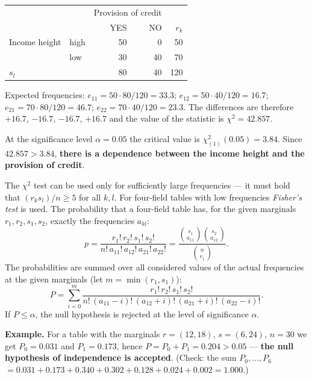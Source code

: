 \documentclass[11pt,a4paper]{article}
\theoremstyle{definition}
\begin{document}
\begin{defbox}
\begin{center}
\begin{tabular}{@{}llrrr@{}}
\toprule
& & \multicolumn{2}{c}{Provision of credit} & \\
& & YES & NO & $r_k$ \\
\midrule
Income height & high & 50 & 0 & 50 \\
              & low & 30 & 40 & 70 \\
\midrule
$s_l$ & & 80 & 40 & 120 \\
\bottomrule
\end{tabular}
\end{center}

Expected frequencies: $e_{11}=50\cdot 80/120=33.3$; $e_{12}=50\cdot 40/120=16.7$;
$e_{21}=70\cdot 80/120=46.7$; $e_{22}=70\cdot 40/120=23.3$. The differences are therefore
$+16.7$, $-16.7$, $-16.7$, $+16.7$ and the value of the statistic is $\chi^2=42.857$.

At the significance level $\alpha=0.05$ the critical value is
$\chi^2_{(1)}(0.05)=3.84$. Since $42.857>3.84$, \textbf{there is a dependence between the income
height and the provision of credit}.
\end{defbox}

\begin{defbox}
The $\chi^2$ test can be used only for sufficiently large frequencies --- it must hold that
$(r_k s_l)/n\ge 5$ for all $k,l$. For four-field tables with low frequencies \emph{Fisher's
test} is used. The probability that a four-field table has, for the given marginals
$r_1,r_2,s_1,s_2$, exactly the frequencies $a_{kl}$:
\[ p=\frac{r_1!\,r_2!\,s_1!\,s_2!}{n!\,a_{11}!\,a_{12}!\,a_{21}!\,a_{22}!}
     =\frac{\binom{s_1}{a_{11}}\binom{s_2}{a_{12}}}{\binom{n}{r_1}}. \]
The probabilities are summed over all considered values of the actual frequencies at the given
marginals (let $m=\min(r_1,s_1)$):
\[ P=\sum_{i=0}^{m}\frac{r_1!\,r_2!\,s_1!\,s_2!}{n!\,(a_{11}-i)!\,(a_{12}+i)!\,(a_{21}+i)!\,(a_{22}-i)!}. \]
If $P\le\alpha$, the null hypothesis is rejected at the level of significance $\alpha$.

\textbf{Example.} For a table with the marginals $r=(12,18)$, $s=(6,24)$, $n=30$ we get
$P_0=0.031$ and $P_1=0.173$, hence $P=P_0+P_1=0.204>0.05$ --- \textbf{the null hypothesis of
independence is accepted}. (Check: the sum $P_0,\dots,P_6$
$=0.031+0.173+0.340+0.302+0.128+0.024+0.002=1.000$.)
\end{defbox}
\end{document}

